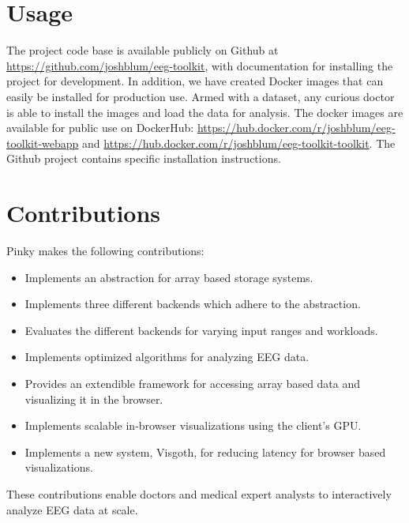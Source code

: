 \section{Usage}

The project code base is available publicly on Github \cite{github} at
\url{https://github.com/joshblum/eeg-toolkit}, with documentation for
installing the project for development. In addition, we have created Docker
\cite{docker} images that can easily be installed for production use. Armed
with a dataset, any curious doctor is able to install the images and load the
data for analysis. The docker images are available for public use on DockerHub:
\url{https://hub.docker.com/r/joshblum/eeg-toolkit-webapp} and
\url{https://hub.docker.com/r/joshblum/eeg-toolkit-toolkit}. The Github project
contains specific installation instructions.

\section{Contributions}

Pinky makes the following contributions:

\begin{itemize}

  \item Implements an abstraction for array based storage systems.

  \item Implements three different backends which adhere to the abstraction.

  \item Evaluates the different backends for varying input ranges and
    workloads.

  \item Implements optimized algorithms for analyzing EEG data.

  \item Provides an extendible framework for accessing array based data and
    visualizing it in the browser.

  \item Implements scalable in-browser visualizations using the client's GPU.

  \item Implements a new system, Visgoth, for reducing latency for browser
    based visualizations.

\end{itemize}

These contributions enable doctors and medical expert analysts to interactively
analyze EEG data at scale.

